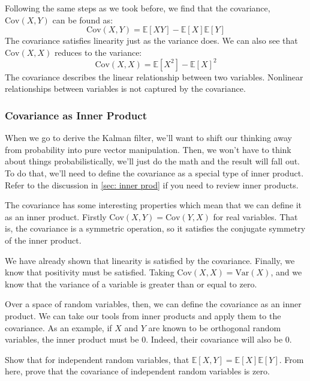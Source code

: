 Following the same steps as we took before, we find that the covariance, $\text{Cov}(X,Y)$ can be found as:
$$\text{Cov}(X,Y)=\mathbb{E}[XY]-\mathbb{E}[X]\mathbb{E}[Y]$$
The covariance satisfies linearity just as the variance does. We can also see that $\text{Cov}(X,X)$ reduces to the variance:
$$\text{Cov}(X,X)=\mathbb{E}[X^2]-\mathbb{E}[X]^2$$
The covariance describes the linear relationship between two variables. Nonlinear relationships between variables is not captured by the covariance.

\subsubsection{Covariance as Inner Product}

When we go to derive the Kalman filter, we'll want to shift our thinking away from probability into pure vector manipulation. Then, we won't have to think about things probabilistically, we'll just do the math and the result will fall out. To do that, we'll need to define the covariance as a special type of inner product. Refer to the discussion in \autoref{sec: inner prod} if you need to review inner products.

The covariance has some interesting properties which mean that we can define it as an inner product. Firstly $\textrm{Cov}(X,Y)=\textrm{Cov}(Y,X)$ for real variables. That is, the covariance is a symmetric operation, so it satisfies the conjugate symmetry of the inner product.

We have already shown that linearity is satisfied by the covariance. Finally, we know that positivity must be satisfied. Taking $\text{Cov}(X,X)=\text{Var}(X)$, and we know that the variance of a variable is greater than or equal to zero.

Over a space of random variables, then, we can define the covariance as an inner product. We can take our tools from inner products and apply them to the covariance. As an example, if $X$ and $Y$ are known to be orthogonal random variables, the inner product must be 0. Indeed, their covariance will also be 0.

\begin{exercise}
Show that for independent random variables, that $\mathbb{E}[X,Y] = \mathbb{E}[X]\mathbb{E}[Y]$. From here, prove that the covariance of independent random variables is zero.
\end{exercise}

